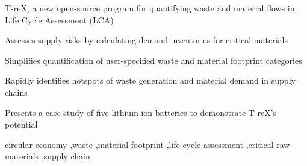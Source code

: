 \documentclass[a4paper,fleqn]{cas-dc}
\begin{document}
\begin{highlights}
	\item T-reX, a new open-source program for quantifying waste and material flows in	Life Cycle Assessment (LCA)
	\item Assesses supply risks by calculating demand inventories for critical materials
	\item Simplifies quantification of user-specified waste and material footprint categories
	\item Rapidly identifies hotspots of waste generation and material demand in supply	chains
	\item Presents a case study of five lithium-ion batteries to demonstrate T-reX's potential
\end{highlights}

\begin{keywords}
	circular economy \sep waste \sep material footprint \sep life cycle assessment \sep critical raw materials \sep supply chain
\end{keywords}



\end{document}
